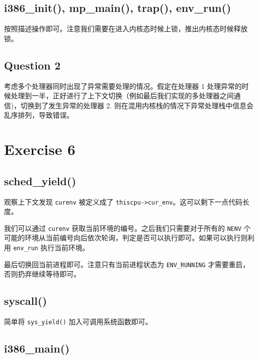 \documentclass[11pt]{article}
\begin{document}
	\subsection*{i386\_init(), mp\_main(), trap(), env\_run()}
	
	\par 按照描述操作即可。注意我们需要在进入内核态时候上锁，推出内核态时候释放锁。
	
	\subsection*{Question 2}
	
	\par 考虑多个处理器同时出现了异常需要处理的情况。假定在处理器 1 处理异常的时候处理到一半，正好进行了上下文切换（例如最后我们实现的多处理器之间通信)，切换到了发生异常的处理器 2. 则在混用内核栈的情况下异常处理栈中信息会乱序排列，导致错误。
	
	\section{Exercise 6}
	
	\subsection*{sched\_yield()}
	
	\par 观察上下文发现 \texttt{curenv} 被定义成了 \texttt{thiscpu->cur\_env}。这可以剩下一点代码长度。
	
	\par 我们可以通过 \texttt{curenv} 获取当前环境的编号。之后我们只需要对于所有的 \texttt{NENV} 个可能的环境从当前编号向后依次轮询，判定是否可以执行即可。如果可以执行则利用 \texttt{env\_run} 执行当前环境。
	
	\par 最后切换回当前进程即可。注意只有当前进程状态为 \texttt{ENV\_RUNNING} 才需要重启，否则扔弃继续等待即可。
	
	
	\subsection*{syscall()}
	
	\par 简单将 \texttt{sys\_yield()} 加入可调用系统函数即可。
	
	\subsection*{i386\_main()}
	
\end{document}
